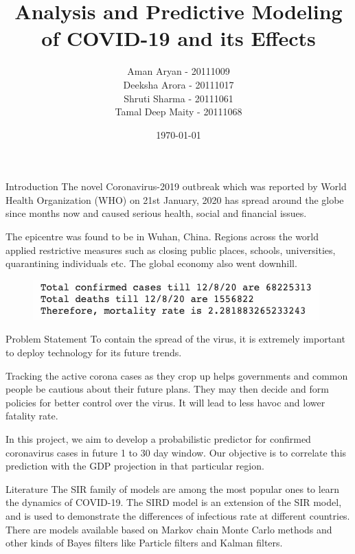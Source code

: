 \documentclass[11pt]{beamer}
\author[CS771]{ \small Aman Aryan - 20111009  \\ Deeksha Arora - 20111017 \\ Shruti Sharma - 20111061  \\ Tamal Deep Maity - 20111068}
\title[COVID19 -  Prediction and Effects]{Analysis and Predictive Modeling of COVID-19 and its Effects}
\institute[]{Indian Institute of Technology, Kanpur}
\date{\today}
\begin{document}
\begin{frame}
\titlepage
\end{frame}

\begin{frame}{Introduction}
The novel Coronavirus-2019 outbreak which was reported by World Health Organization (WHO) on 21st January, 2020 has spread around the globe since months now and caused serious health, social and financial issues.

\medskip

The epicentre was found to be in Wuhan, China. Regions across the world applied restrictive measures such as closing public places, schools, universities, quarantining individuals etc. The global economy also went downhill.

\begin{figure}
\includegraphics[scale=0.5]{stats}
\end{figure}

\end{frame}

\begin{frame}{Problem Statement}
To contain the spread of the virus, it is extremely important to deploy technology for its future trends.\\

\medskip

Tracking the active corona cases as they crop up helps governments and common people be cautious about their future plans. They may then decide and form policies for better control over the virus. It will lead to less havoc and lower fatality rate.

\medskip

In this project, we aim to develop a probabilistic predictor for confirmed coronavirus cases in future 1 to 30 day window. Our objective is to correlate this prediction with the GDP projection in that particular region.
\end{frame}

\begin{frame}{Literature}
The SIR family of models are among the most popular ones to learn the dynamics of COVID-19. The SIRD model is an extension of the SIR model, and is used to demonstrate the differences of infectious rate at different countries.\\

There are models available based on Markov chain Monte Carlo methods and other kinds of Bayes filters like Particle filters and Kalman filters.
\end{frame}
\end{document}
